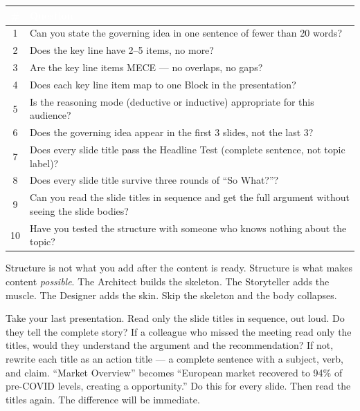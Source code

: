 \begin{center}
\small
{}
\begin{tabularx}{\textwidth}{c X}
\toprule
\rowcolor{tableheader}
\textcolor{white}{\textbf{\#}} & \textcolor{white}{\textbf{Question}} \\
\midrule
1 & Can you state the governing idea in one sentence of fewer than 20 words? \\
2 & Does the key line have 2--5 items, no more? \\
\rowcolor{altrow}
3 & Are the key line items MECE --- no overlaps, no gaps? \\
4 & Does each key line item map to one Block in the presentation? \\
\rowcolor{altrow}
5 & Is the reasoning mode (deductive or inductive) appropriate for this audience? \\
6 & Does the governing idea appear in the first 3 slides, not the last 3? \\
\rowcolor{altrow}
7 & Does every slide title pass the Headline Test (complete sentence, not topic label)? \\
8 & Does every slide title survive three rounds of ``So What?''? \\
\rowcolor{altrow}
9 & Can you read the slide titles in sequence and get the full argument without seeing the slide bodies? \\
10 & Have you tested the structure with someone who knows nothing about the topic? \\
\bottomrule
\end{tabularx}
\end{center}

\vspace{0.5em}

\begin{lessonbox}
Structure is not what you add after the content is ready. Structure is what makes content \emph{possible}. The Architect builds the skeleton. The Storyteller adds the muscle. The Designer adds the skin. Skip the skeleton and the body collapses.
\end{lessonbox}


\begin{keybox}
Take your last presentation. Read only the slide titles in sequence, out loud. Do they tell the complete story? If a colleague who missed the meeting read only the titles, would they understand the argument and the recommendation? If not, rewrite each title as an action title --- a complete sentence with a subject, verb, and claim. ``Market Overview'' becomes ``European market recovered to 94\% of pre-COVID levels, creating a  opportunity.'' Do this for every slide. Then read the titles again. The difference will be immediate.
\end{keybox}
